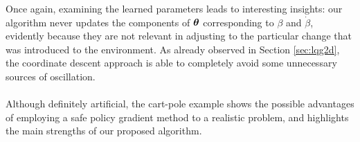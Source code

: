 Once again, examining the learned parameters leads to interesting insights: our algorithm never updates the components of $\boldsymbol{\theta}$ corresponding to $\beta$ and $\dot{\beta}$, evidently because they are not relevant in adjusting to the particular change that was introduced to the environment. As already observed in Section \ref{sec:lqg2d}, the coordinate descent approach is able to completely avoid some unnecessary sources of oscillation.

\paragraph{}
Although definitely artificial, the cart-pole example shows the possible advantages of employing a safe policy gradient method to a realistic problem, and highlights the main strengths of our proposed algorithm.
